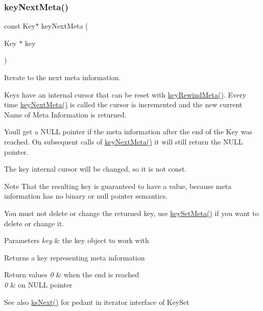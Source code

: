 \subsubsection{\texorpdfstring{key\+Next\+Meta()}{keyNextMeta()}}
{\footnotesize\ttfamily const Key$\ast$ key\+Next\+Meta (\begin{DoxyParamCaption}\item[{Key $\ast$}]{key }\end{DoxyParamCaption})}



Iterate to the next meta information. 

Keys have an internal cursor that can be reset with \hyperlink{group__keymeta_ga5dbb669802eea27e106ee3a5e39717a9}{key\+Rewind\+Meta()}. Every time \hyperlink{group__keymeta_ga4c88342f580a4291455a801af71ce048}{key\+Next\+Meta()} is called the cursor is incremented and the new current Name of Meta Information is returned.

You\textquotesingle{}ll get a N\+U\+LL pointer if the meta information after the end of the Key was reached. On subsequent calls of \hyperlink{group__keymeta_ga4c88342f580a4291455a801af71ce048}{key\+Next\+Meta()} it will still return the N\+U\+LL pointer.

The {\ttfamily key} internal cursor will be changed, so it is not const.

\begin{DoxyNote}{Note}
That the resulting key is guaranteed to have a value, because meta information has no binary or null pointer semantics.

You must not delete or change the returned key, use \hyperlink{group__keymeta_gae1f15546b234ffb6007d8a31178652b9}{key\+Set\+Meta()} if you want to delete or change it.
\end{DoxyNote}

\begin{DoxyParams}{Parameters}
{\em key} & the key object to work with \\
\hline
\end{DoxyParams}
\begin{DoxyReturn}{Returns}
a key representing meta information 
\end{DoxyReturn}

\begin{DoxyRetVals}{Return values}
{\em 0} & when the end is reached \\
\hline
{\em 0} & on N\+U\+LL pointer\\
\hline
\end{DoxyRetVals}
\begin{DoxySeeAlso}{See also}
\hyperlink{group__keyset_ga317321c9065b5a4b3e33fe1c399bcec9}{ks\+Next()} for pedant in iterator interface of Key\+Set 
\end{DoxySeeAlso}
\mbox{\label{group__keymeta_ga5dbb669802eea27e106ee3a5e39717a9}} 
